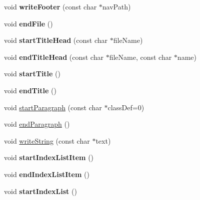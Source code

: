 \begin{DoxyCompactItemize}
\mbox{\label{class_output_list_a97a0ce24de0f13c745f9ce81fd935509}} 
void {\bfseries write\+Footer} (const char $\ast$nav\+Path)
\item 
\mbox{\label{class_output_list_a5b0f833d3150110151ae6a095a8549a5}} 
void {\bfseries end\+File} ()
\item 
\mbox{\label{class_output_list_afa545f07e33be5cc67d214fea88bdee8}} 
void {\bfseries start\+Title\+Head} (const char $\ast$file\+Name)
\item 
\mbox{\label{class_output_list_a77a0df4075d36362e3944f2f7fc358b8}} 
void {\bfseries end\+Title\+Head} (const char $\ast$file\+Name, const char $\ast$name)
\item 
\mbox{\label{class_output_list_a0edaede07adae2149d715105433848c9}} 
void {\bfseries start\+Title} ()
\item 
\mbox{\label{class_output_list_a6b1d6b4e89edaebfe3291b24505e80c5}} 
void {\bfseries end\+Title} ()
\item 
void \mbox{\hyperlink{class_output_list_a809351ce4027f4fc083cfb68d5e740eb}{start\+Paragraph}} (const char $\ast$class\+Def=0)
\item 
void \mbox{\hyperlink{class_output_list_a6523eb013a6f759d505650de41855085}{end\+Paragraph}} ()
\item 
void \mbox{\hyperlink{class_output_list_adeaf5f7b41eca22a3afbc415a8390767}{write\+String}} (const char $\ast$text)
\item 
\mbox{\label{class_output_list_adf2df33c38b53c9b95fe003aed5bc222}} 
void {\bfseries start\+Index\+List\+Item} ()
\item 
\mbox{\label{class_output_list_aac70ec48d9f50b625f757a02a7758712}} 
void {\bfseries end\+Index\+List\+Item} ()
\item 
\mbox{\label{class_output_list_ace955285a164c7f27f0923986a36cff5}} 
void {\bfseries start\+Index\+List} ()
\item 
\mbox{\label{class_output_list_a5577c7f73e2b8925ba8aedad6c5d1cc9}} 

\end{DoxyCompactItemize}
